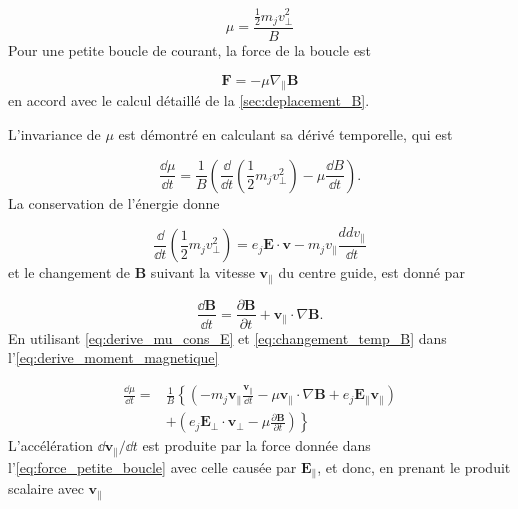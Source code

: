 \documentclass[main.tex]{subfiles}
\begin{document}
\begin{equation}
	\mu = \frac{\frac{1}{2} m_j v_\perp^2}{B}
	\label{eq:def_mu_2}
\end{equation}
Pour une petite boucle de courant, la force de la boucle est

\begin{equation}
	\bm{F} = - \mu \nabla_\parallel \bm{B}
	\label{eq:force_petite_boucle}
\end{equation}
en accord avec le calcul détaillé de la \autoref{sec:deplacement_B}.

L'invariance de \( \mu \) est démontré en calculant sa dérivé temporelle, qui est

\begin{equation}
	\frac{\dd \mu}{\dd t} = \frac{1}{B} \left( \frac{\dd}{\dd t} \left( \frac{1}{2} m_j v_\perp^2 \right) - \mu \frac{\dd B}{\dd t} \right).
	\label{eq:derive_moment_magnetique}
\end{equation}
La conservation de l'énergie donne

\begin{equation}
	\frac{\dd}{\dd t} \left( \frac{1}{2} m_j v_\perp^2 \right) = e_j \bm{E} \cdot \bm{v} - m_j v_\parallel \frac{dd v_\parallel}{\dd t}
	\label{eq:derive_mu_cons_E}
\end{equation}
et le changement de \( \bm{B} \) suivant la vitesse \( \bm{v_\parallel} \) du centre guide, est donné par

\begin{equation}
	\frac{\dd \bm{B}}{\dd t} = \frac{\partial \bm{B}}{\partial t} + \bm{v_\parallel} \cdot \nabla \bm{B}.
	\label{eq:changement_temp_B}
\end{equation}
En utilisant \autoref{eq:derive_mu_cons_E} et \autoref{eq:changement_temp_B} dans l'\autoref{eq:derive_moment_magnetique}

\begin{align}
	\frac{\dd \mu }{\dd t} = & \frac{1}{B} \left\lbrace \left( - m_j \bm{v_\parallel} \frac{\bm{v_\parallel}}{\dd t} - \mu \bm{v_\parallel} \cdot \nabla \bm{B} + e_j \bm{E_\parallel} \bm{v_\parallel} \right) \right. \nonumber\\
	& + \left. \left( e_j \bm{E_\perp} \cdot \bm{v_\perp} - \mu \frac{\partial \bm{B}}{\partial t} \right) \right\rbrace
	\label{eq:derive_moment_magnetique_2}
\end{align}
L'accélération \( \dd \bm{v_\parallel} / \dd t \) est produite par la force donnée dans l'\autoref{eq:force_petite_boucle} avec celle causée par \( \bm{E_\parallel} \), et donc, en prenant le produit scalaire avec \( \bm{v_\parallel} \)
\end{document}
